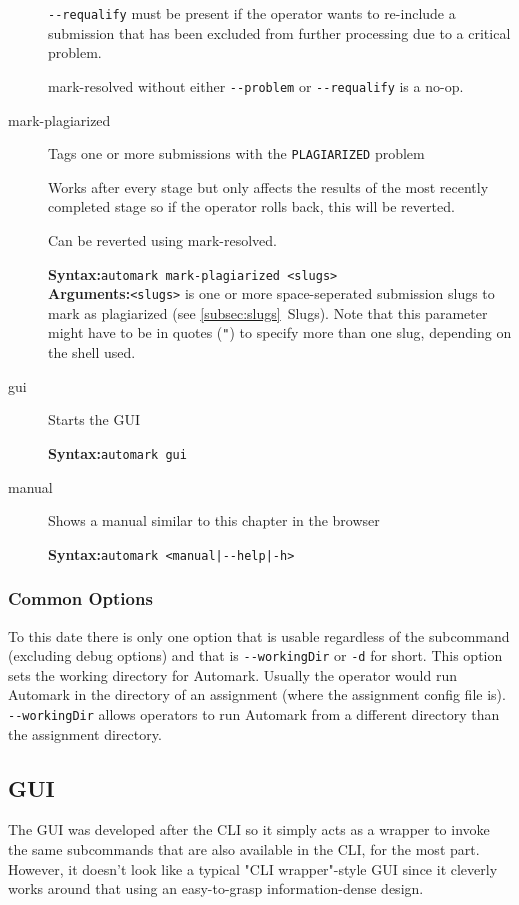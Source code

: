 \documentclass[12pt,a4paper,oneside]{report}
\begin{document}
\begin{description}
		\lstinline|--requalify| must be present if the operator wants to re-include a submission that has been excluded from further processing due to a critical problem.

		mark-resolved without either \lstinline|--problem| or \lstinline|--requalify| is a no-op.

		\item[mark-plagiarized] Tags one or more submissions with the \lstinline|PLAGIARIZED| problem

		Works after every stage but only affects the results of the most recently completed stage so if the operator rolls back, this will be reverted.

		Can be reverted using mark-resolved.

		\textbf{Syntax:}\tabto{75pt}\lstinline|automark mark-plagiarized <slugs>|\\
		\textbf{Arguments:}\tabto{75pt}\lstinline|<slugs>| is one or more space-seperated submission slugs to mark as plagiarized (see \ref{subsec:slugs}~Slugs). Note that this parameter might have to be in quotes (\lstinline|"|) to specify more than one slug, depending on the shell used.

		\item[gui] Starts the GUI

		\textbf{Syntax:}\tabto{75pt}\lstinline|automark gui|

		\item[manual] Shows a manual similar to this chapter in the browser

		\textbf{Syntax:}\tabto{75pt}\lstinline[mathescape]!automark <manual|--help|-h>!
	\end{description}

	\pagebreak
	\subsubsection{Common Options}
	To this date there is only one option that is usable regardless of the subcommand (excluding debug options) and that is \lstinline|--workingDir| or \lstinline|-d| for short. This option sets the working directory for Automark. Usually the operator would run Automark in the directory of an assignment (where the assignment config file is). \lstinline|--workingDir| allows operators to run Automark from a different directory than the assignment directory.

	\subsection{GUI}
	The GUI was developed after the CLI so it simply acts as a wrapper to invoke the same subcommands that are also available in the CLI, for the most part. However, it doesn't look like a typical "CLI wrapper"-style GUI since it cleverly works around that using an easy-to-grasp information-dense design.
\end{document}
